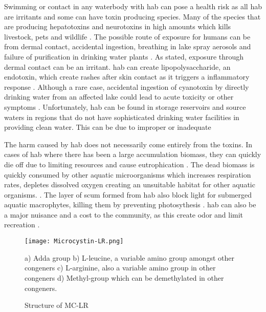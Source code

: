 Swimming or contact in any waterbody with \gls{hab} can pose a health risk as all \gls{hab} are irritants and some can have toxin producing species. Many of the species that are producing hepatotoxins and neurotoxins in high amounts which kills livestock, pets and wildlife \cite{anderson_harmful_2002}. The possible route of exposure  for humans can be from dermal contact, accidental ingestion, breathing in lake spray aerosols and failure of purification in drinking water plants \cite{may_aerosol_2018,codd_cyanobacterial_1999}. As stated, exposure through dermal contact can be an irritant. \gls{hab} can create lipopolysaccharide, an endotoxin, which create rashes after skin contact as it triggers a inflammatory response \cite{ moore_richard_cyanobacterial_1993}. Although a rare case, accidental ingestion of cyanotoxin by directly drinking water from an affected lake could  lead to acute toxicity or other symptoms \cite{monks_potent_2007}. Unfortunately, \gls{hab} can be found in storage reservoirs and source waters in regions that do not have sophisticated drinking water facilities in providing clean water. This can be due to improper or inadequate %

The harm caused by \gls{hab} does not necessarily come entirely from the toxins. In cases of \gls{hab} where there has been a large accumulation biomass, they can quickly die off due to limiting resources and cause eutrophication \cite{charlton_oxygen_1980}. The dead biomass is quickly consumed by other aquatic microorganisms which increases respiration rates, depletes dissolved oxygen creating an unsuitable habitat for other aquatic organisms.  \cite{anderson_harmful_2002}.
The layer of scum formed from \gls{hab} also block light for submerged aquatic macrophytes, killing them by preventing photosythesis \cite{ bucak_modeling_2018}. \gls{hab} can also be a major nuisance and a cost to the community, as this create odor and limit recreation \cite{graham_cyanotoxin_2010, carmichael_health_2016}.



 \begin{figure}[t]
   \texttt{[image: Microcystin-LR.png]}
   \caption{Structure of MC-LR}
   \label{fig:structure1}
   \begin{flushleft}
   a) Adda group
   b) L-leucine, a variable amino group amongst other congeners
   c) L-arginine, also a variable amino group in other congeners
   d) Methyl-group which can be demethylated in other congeners.
     \end{flushleft}

 \end{figure}


